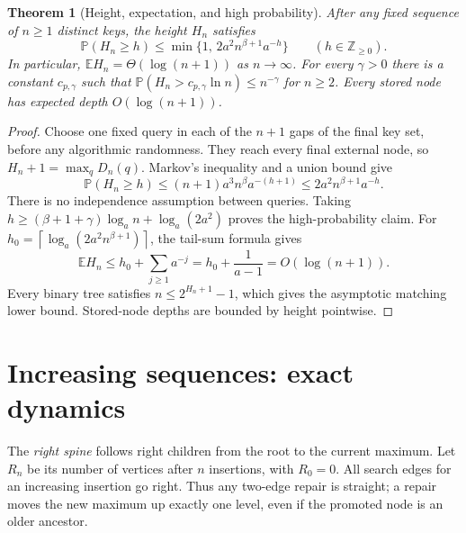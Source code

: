 \documentclass[11pt]{article}
\newtheorem{theorem}{Theorem}[section]
\newcommand{\E}{\mathbb E}
\newcommand{\Prob}{\mathbb P}
\newcommand{\ceil}[1]{\left\lceil #1\right\rceil}
\begin{document}
\begin{theorem}[Height, expectation, and high probability]\label{thm:height}
After any fixed sequence of $n\ge1$ distinct keys, the height $H_n$ satisfies
\begin{equation}
 \Prob(H_n\ge h)\le
 \min\{1,\,2a^2n^{\beta+1}a^{-h}\}\qquad(h\in\mathbb Z_{\ge0}).
                                                               \label{eq:height-tail}
\end{equation}
In particular, $\E H_n=\Theta(\log(n+1))$ as $n\to\infty$.
For every $\gamma>0$ there is a constant $c_{p,\gamma}$ such that
$\Prob(H_n>c_{p,\gamma}\ln n)\le n^{-\gamma}$ for $n\ge2$.
Every stored node has expected depth $O(\log(n+1))$.
\end{theorem}
\begin{proof}
Choose one fixed query in each of the $n+1$ gaps of the final key set, before
any algorithmic randomness. They reach every final external node, so
$H_n+1=\max_q D_n(q)$. Markov's inequality and a union bound give
\[
 \Prob(H_n\ge h)
 \le(n+1)a^3n^\beta a^{-(h+1)}
 \le2a^2n^{\beta+1}a^{-h}.
\]
There is no independence assumption between queries. Taking
$h\ge(\beta+1+\gamma)\log_a n+\log_a(2a^2)$ proves the high-probability claim.
For $h_0=\ceil{\log_a(2a^2n^{\beta+1})}$, the tail-sum formula gives
\[
 \E H_n\le h_0+\sum_{j\ge1}a^{-j}=h_0+\frac1{a-1}=O(\log(n+1)).
\]
Every binary tree satisfies $n\le2^{H_n+1}-1$, which gives the asymptotic
matching lower bound. Stored-node depths are bounded by height pointwise.
\end{proof}

\section{Increasing sequences: exact dynamics}\label{sec:increasing}
The \emph{right spine} follows right children from the root to the current
maximum. Let $R_n$ be its number of vertices after $n$ insertions, with $R_0=0$.
All search edges for an increasing insertion go right. Thus any two-edge repair
is straight; a repair moves the new maximum up exactly one level, even if the
promoted node is an older ancestor.
\end{document}
